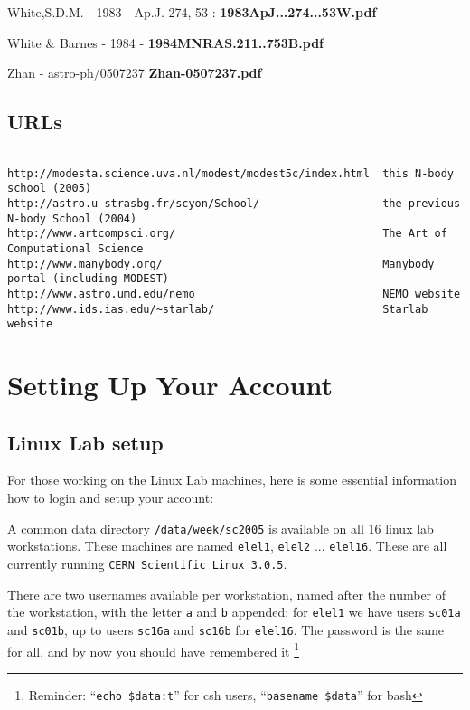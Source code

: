 White,S.D.M. - 1983 - Ap.J. 274, 53 : {\bf 1983ApJ...274...53W.pdf}

White \& Barnes - 1984 - {\bf 1984MNRAS.211..753B.pdf}

Zhan - astro-ph/0507237 {\bf Zhan-0507237.pdf}

\section*{URLs}

\begin{verbatim}

http://modesta.science.uva.nl/modest/modest5c/index.html  this N-body school (2005)
http://astro.u-strasbg.fr/scyon/School/                   the previous N-body School (2004)
http://www.artcompsci.org/                                The Art of Computational Science
http://www.manybody.org/                                  Manybody portal (including MODEST)
http://www.astro.umd.edu/nemo                             NEMO website
http://www.ids.ias.edu/~starlab/                          Starlab website

\end{verbatim}


\appendix
\chapter                {Setting Up Your Account}

\section{Linux Lab setup}

For those working on the Linux Lab machines, here is some essential 
information how to login and setup your account:

A common data directory {\tt /data/week/sc2005} is available on all 16
linux lab workstations. These machines are 
named {\tt elel1}, {\tt elel2} ... {\tt elel16}. 
These are all currently running {\tt CERN Scientific Linux 3.0.5}.

There are two usernames available per workstation, named after the number
of the workstation, with the letter {\tt a} and {\tt b} appended:
for {\tt elel1} we have users {\tt sc01a} and {\tt sc01b},
up to 
users {\tt sc16a} and {\tt sc16b} for {\tt elel16}. The password is
the same for all, and by now you should have remembered it
\footnote{Reminder: ``{\tt echo \$data:t}'' for csh users, ``{\tt basename \$data}''
for bash}

